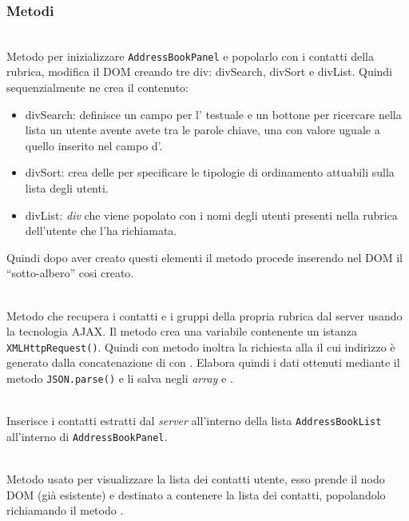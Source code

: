 \subsubsection*{Metodi}
\begin{description}	
	
	\item{}\\
	Metodo per inizializzare  \texttt{AddressBookPanel} e popolarlo con i contatti della rubrica, modifica il DOM creando tre div: divSearch, divSort e divList. Quindi sequenzialmente ne crea il contenuto:
		\begin{itemize}
			\item divSearch: definisce un campo per l' testuale e un bottone per ricercare nella lista un utente avente avete tra le parole chiave, una con valore uguale a quello inserito nel campo d'.
			\item divSort: crea delle  per specificare le tipologie di ordinamento attuabili sulla lista degli utenti.
			\item divList: \textit{div} che viene popolato con i nomi degli utenti presenti nella rubrica dell'utente che l'ha richiamata.
		\end{itemize}

Quindi dopo aver creato questi elementi il metodo procede inserendo nel DOM il ``sotto-albero'' cosi creato.

	\item{}\\
Metodo che recupera i contatti e i gruppi della propria rubrica dal server usando la tecnologia AJAX. Il metodo crea una variabile contenente un istanza \texttt{XMLHttpRequest()}. Quindi con metodo  inoltra la richiesta alla  il cui indirizzo è generato dalla concatenazione di  con . Elabora quindi i dati ottenuti mediante il metodo \texttt{JSON.parse()} e li salva negli \textit{array}  e .
	
	\item{}\\
	Inserisce i contatti estratti dal \textit{server} all'interno della lista \texttt{AddressBookList} all'interno di \texttt{AddressBookPanel}.
	
	\item{}\\
	Metodo usato per visualizzare la lista dei contatti utente, esso prende il nodo DOM (già esistente) e destinato a contenere la lista dei contatti, popolandolo richiamando il metodo .
	

\end{description}
